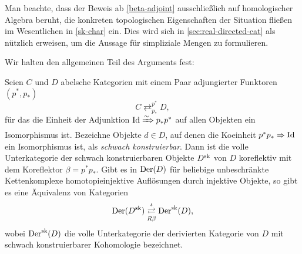 \begin{bem} \label{sk-homalg}
  Man beachte, dass der Beweis ab \ref{beta-adjoint} ausschließlich
  auf homologischer Algebra beruht, die konkreten topologischen
  Eigenschaften der Situation fließen im Wesentlichen in \ref{sk-char}
  ein. Dies wird sich in \autoref{sec:real-directed-cat} als nützlich
  erweisen, um die Aussage für simpliziale Mengen zu formulieren.
\end{bem}
Wir halten den allgemeinen Teil des Arguments fest:
\begin{satz} \label{gen-sk}
  Seien $C$ und $D$ abelsche Kategorien mit einem Paar adjungierter
  Funktoren $(p^*, p_*)$
  \[ C \mathrel{\mathop{\rightleftarrows}^{p^*}_{p_*}} D, \]
  für das die Einheit der Adjunktion $\operatorname{Id} \xRightarrow{\sim} p_* p^*$ auf allen
  Objekten ein Isomorphismus ist. Bezeichne Objekte $d \in D$, auf
  denen die Koeinheit $p^* p_* \Rightarrow \operatorname{Id}$ ein Isomorphismus ist, als
  \emph{schwach konstruierbar}. Dann ist die volle Unterkategorie der
  schwach konstruierbaren Objekte $D^{\operatorname{sk}}$ von $D$ koreflektiv mit
  dem Koreflektor $\beta = p^* p_*$. Gibt es in $\operatorname{Der}(D)$ für
  beliebige unbeschränkte Kettenkomplexe homotopieinjektive
  Auflösungen durch injektive Objekte, so gibt es eine Äquivalenz von
  Kategorien
  \[ \operatorname{Der}(D^{\operatorname{sk}})
  \mathrel{\mathop{\rightleftarrows}^{\iota}_{R \beta}}
  \operatorname{Der}^{\operatorname{sk}}(D),
  \]
  wobei $\operatorname{Der}^{\operatorname{sk}}(D)$ die volle Unterkategorie der derivierten
  Kategorie von $D$ mit schwach konstruierbarer Kohomologie
  bezeichnet.
\end{satz}
